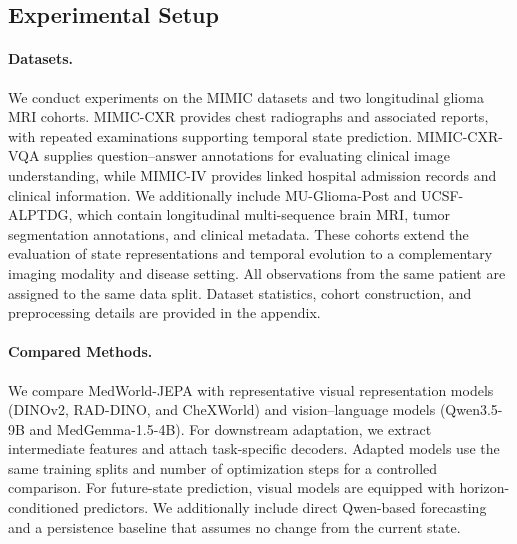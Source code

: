 \subsection{Experimental Setup}
\label{sec:experiments}

\paragraph{Datasets.}
We conduct experiments on the MIMIC datasets and two longitudinal glioma MRI cohorts. MIMIC-CXR provides chest radiographs and associated reports, with repeated examinations supporting temporal state prediction. MIMIC-CXR-VQA supplies question--answer annotations for evaluating clinical image understanding, while MIMIC-IV provides linked hospital admission records and clinical information. We additionally include MU-Glioma-Post and UCSF-ALPTDG, which contain longitudinal multi-sequence brain MRI, tumor segmentation annotations, and clinical metadata. These cohorts extend the evaluation of state representations and temporal evolution to a complementary imaging modality and disease setting. All observations from the same patient are assigned to the same data split. Dataset statistics, cohort construction, and preprocessing details are provided in the appendix.

\paragraph{Compared Methods.}
We compare MedWorld-JEPA with representative visual representation models (DINOv2, RAD-DINO, and CheXWorld) and vision--language models (Qwen3.5-9B and MedGemma-1.5-4B). For downstream adaptation, we extract intermediate features and attach task-specific decoders. Adapted models use the same training splits and number of optimization steps for a controlled comparison. For future-state prediction, visual models are equipped with horizon-conditioned predictors. We additionally include direct Qwen-based forecasting and a persistence baseline that assumes no change from the current state.
